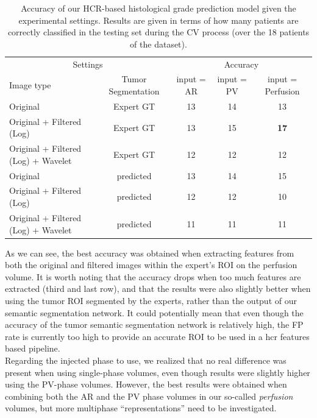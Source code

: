 {\renewcommand{\arraystretch}{2}
\begin{table}[!htp]
\begin{mdframed}[backgroundcolor=blue!50,linecolor=blue!50]
\centering
\caption{Accuracy of our HCR-based histological grade prediction model given the experimental settings. Results are given in terms of how many patients are correctly classified in the testing set during the CV process (over the 18 patients of the dataset).}\label{tab:hcrGrade}
\scriptsize
\begin{tabular}{lcccc}\toprule
\multicolumn{2}{c}{Settings} &\multicolumn{3}{c}{Accuracy} \\\cmidrule{1-5}
Image type &Tumor Segmentation & input = AR &input = PV &input = Perfusion \\\midrule
Original & Expert GT & 13  & 14  & 13  \\
Original + Filtered (Log) & Expert GT & 13  &15  & \textbf{17}  \\
Original + Filtered (Log) + Wavelet & Expert GT & 12  & 12  & 12  \\
Original & predicted & 13  & 14  &15  \\
Original + Filtered (Log) & predicted &12  & 12  & 10  \\
Original + Filtered (Log) + Wavelet & predicted & 11  & 11  &11  \\
\bottomrule
\end{tabular}
\end{mdframed}
\end{table}
\renewcommand{\arraystretch}{5}
As we can see, the best accuracy was obtained when extracting features from both the original and filtered images within the expert's ROI on the perfusion volume. It is worth noting that the accuracy drops when too much features are extracted (third and last row), and that the results were also slightly better when using the tumor ROI segmented by the experts, rather than the output of our semantic segmentation network. It could potentially mean that even though the accuracy of the tumor semantic segmentation network is relatively high, the FP rate is currently too high to provide an accurate ROI to be used in a \ac{hcr} features based pipeline.\\
Regarding the injected phase to use, we realized that no real difference was present when using single-phase volumes, even though results were slightly higher using the PV-phase volumes. However, the best results were obtained when combining both the AR and the PV phase volumes in our so-called \textit{perfusion} volumes, but more multiphase ``representations'' need to be investigated.
}
